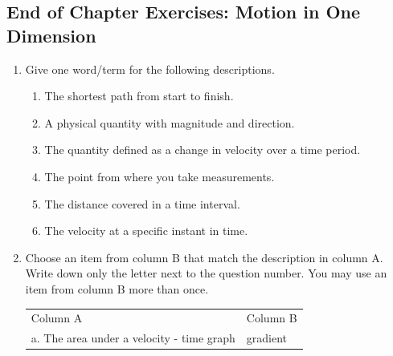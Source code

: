             \subsection{ End of Chapter Exercises: Motion in One Dimension}
            \nopagebreak
      \label{m38796*id81294}\begin{enumerate}[noitemsep, label=\textbf{\arabic*}. ] 
            \label{m38796*uid172}\item Give one word/term for the following descriptions.
\label{m38796*id81309}\begin{enumerate}[noitemsep, label=\textbf{\alph*}. ] 
            \label{m38796*uid173}\item The shortest path from start to finish.
\label{m38796*uid174}\item A physical quantity with magnitude and direction.
\label{m38796*uid175}\item The quantity defined as a change in velocity over a time period.
\label{m38796*uid176}\item The point from where you take measurements.
\label{m38796*uid177}\item The distance covered in a time interval.
\label{m38796*uid178}\item The velocity at a specific instant in time.
\end{enumerate}
                \label{m38796*uid179}\item Choose an item from column B that match the description in column A. Write down only the letter next to the question number. You may use an item from column B more than once.
          \begin{table}[H]
        \begin{center}
      \label{m38796*uid180}
    \noindent
      \tablelasttail{}
      \begin{xtabular}[t]{|l|l|}\hline
        Column A &
        Column B%
     \tabularnewline{}
        a. The area under a velocity - time graph &
        gradient%
     \tabularnewline{}

\end{xtabular}
\end{center}
\end{table}
\end{enumerate}
